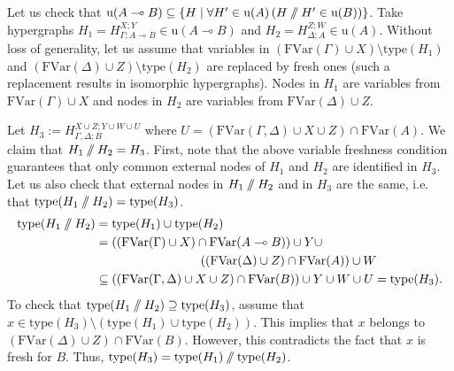 \documentclass[a4paper,UKenglish,cleveref, autoref, thm-restate,pdfa]{lipics-v2021}
\newcommand{\eqdef}{:=}
\newcommand{\type}{\mathrm{type}}
\newcommand{\FVar}{\mathrm{FVar}}
\newcommand{\limpl}{\multimap}
\newcommand{\pc}{\mathbin{/\mkern-6mu/}}
\begin{document}
Let us check that $\mathrm{u}(A \limpl B) \subseteq \{H \mid \forall H^\prime \in \mathrm{u}(A) \, (H \pc H^\prime \in \mathrm{u}(B))\}$. Take hypergraphs $H_1 = H_{\Gamma;A \limpl B}^{X;Y} \in \mathrm{u}(A \limpl B)$ and $H_2 = H_{\Delta;A}^{Z;W} \in \mathrm{u}(A)$. Without loss of generality, let us assume that variables in $(\FVar(\Gamma) \cup X) \setminus \type(H_1)$ and $(\FVar(\Delta) \cup Z) \setminus \type(H_2)$ are replaced by fresh ones (such a replacement results in isomorphic hypergraphs). Nodes in $H_1$ are variables from $\FVar(\Gamma) \cup X$ and nodes in $H_2$ are variables from $\FVar(\Delta) \cup Z$.

Let $H_3 \eqdef H_{\Gamma , \Delta; B}^{X \cup Z ; Y \cup W \cup U}$ where $U = (\FVar(\Gamma, \Delta) \cup X \cup Z) \cap \FVar(A)$. We claim that $H_1 \pc H_2 = H_3$. First, note that the above variable freshness condition guarantees that only common external nodes of $H_1$ and $H_2$ are identified in $H_3$. Let us also check that external nodes in $H_1\pc H_2$ and in $H_3$ are the same, i.e. that $\type(H_1 \pc H_2) = \type(H_3)$. 
\begin{align*}
	\type(H_1 \pc H_2) &= \type(H_1) \cup \type(H_2) 
	\\
	& = ((\FVar(\Gamma) \cup X) \cap \FVar(A \limpl B)) \cup Y \cup
	\\ & \hspace{3cm} ((\FVar(\Delta) \cup Z) \cap \FVar(A)) \cup W
	\\
	& \subseteq
	((\FVar(\Gamma , \Delta) \cup X \cup Z) \cap \FVar(B)) \cup Y \cup W \cup U = \type(H_3).
\end{align*}
To check that $\type(H_1 \pc H_2) \supseteq \type(H_3)$, assume that $x \in \type(H_3) \setminus (\type(H_1) \cup \type(H_2))$. This implies that $x$ belongs to $(\FVar(\Delta) \cup Z) \cap \FVar(B)$. However, this contradicts the fact that $x$ is fresh for $B$. Thus, $\type(H_3) = \type(H_1) \pc \type(H_2)$.
\end{document}
